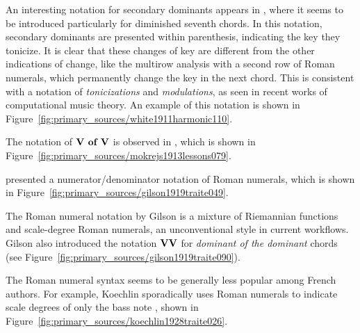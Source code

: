 
An interesting notation for secondary dominants appears in \textcite{white1911harmonic}, where it seems to be introduced particularly for diminished seventh chords.
In this notation, secondary dominants are presented within parenthesis, indicating the key they tonicize.
It is clear that these changes of key are different from the other indications of change, like the multirow analysis with a second row of Roman numerals, which permanently change the key in the next chord.
This is consistent with a notation of \emph{tonicizations} and \emph{modulations}, as seen in recent works of computational music theory.
An example of this notation is shown in Figure~\ref{fig:primary_sources/white1911harmonic110}.


The notation of $\textbf{V of V}\relax\relax$ is observed in \textcite{mokrejs1913lessons}, which is shown in Figure~\ref{fig:primary_sources/mokrejs1913lessons079}.


\textcite{gilson1919traite} presented a numerator/denominator notation of Roman numerals, which is shown in Figure~\ref{fig:primary_sources/gilson1919traite049}.



The Roman numeral notation by Gilson is a mixture of Riemannian functions and scale-degree Roman numerals, an unconventional style in current workflows.
Gilson also introduced the notation $\textbf{VV}\relax\relax$ for \emph{dominant of the dominant} chords (see Figure~\ref{fig:primary_sources/gilson1919traite090}).

The Roman numeral syntax seems to be generally less popular among French authors.
For example, Koechlin sporadically uses Roman numerals to indicate scale degrees of only the bass note \textcite{koechlin1928traite}, shown in Figure~\ref{fig:primary_sources/koechlin1928traite026}.

